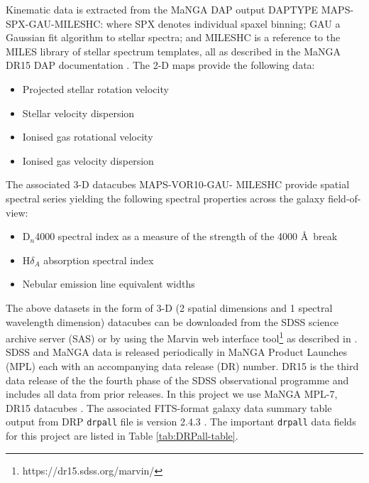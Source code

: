 Kinematic data is extracted from the MaNGA DAP output DAPTYPE MAPS-SPX-GAU-MILESHC: where SPX denotes individual spaxel binning; GAU a Gaussian fit algorithm to stellar spectra; and MILESHC is a reference to the MILES library \citep{2011A&A...532A..95F} of stellar spectrum templates, all as described in the MaNGA DR15 DAP documentation \citet{2019arXiv190100856W}. The 2-D maps provide the following data: 

\begin{itemize}
    \item Projected stellar rotation velocity
    \item Stellar velocity dispersion
    \item Ionised gas rotational velocity
    \item Ionised gas velocity dispersion
\end{itemize}

The associated 3-D datacubes MAPS-VOR10-GAU-
MILESHC provide spatial spectral series yielding the following spectral properties across the galaxy field-of-view:

\begin{itemize}
    \item D$_n$4000 spectral index as a measure of the strength of the 4000 \AA\ break
    \item H$\delta_A$ absorption spectral index
    \item Nebular emission line equivalent widths
\end{itemize}

The above datasets in the form of 3-D (2 spatial dimensions and 1 spectral wavelength dimension) datacubes can be downloaded from the SDSS science archive server (SAS) or by using the Marvin web interface tool\footnote{https://dr15.sdss.org/marvin/} as described in \cite{2018arXiv181203833C}. SDSS and MaNGA data is released periodically in MaNGA Product Launches (MPL) each with an accompanying data release (DR) number. DR15 is the third data release of the the fourth phase of the SDSS observational programme and includes all data from prior releases. In this project we use MaNGA MPL-7, DR15 datacubes \citep{2019ApJS..240...23A}. The associated FITS-format galaxy data summary table output from DRP \texttt{drpall} file is version 2.4.3 \citep{2016AJ....152...83L}. The important \texttt{drpall} data fields for this project are listed in Table \ref{tab:DRPall-table}.

